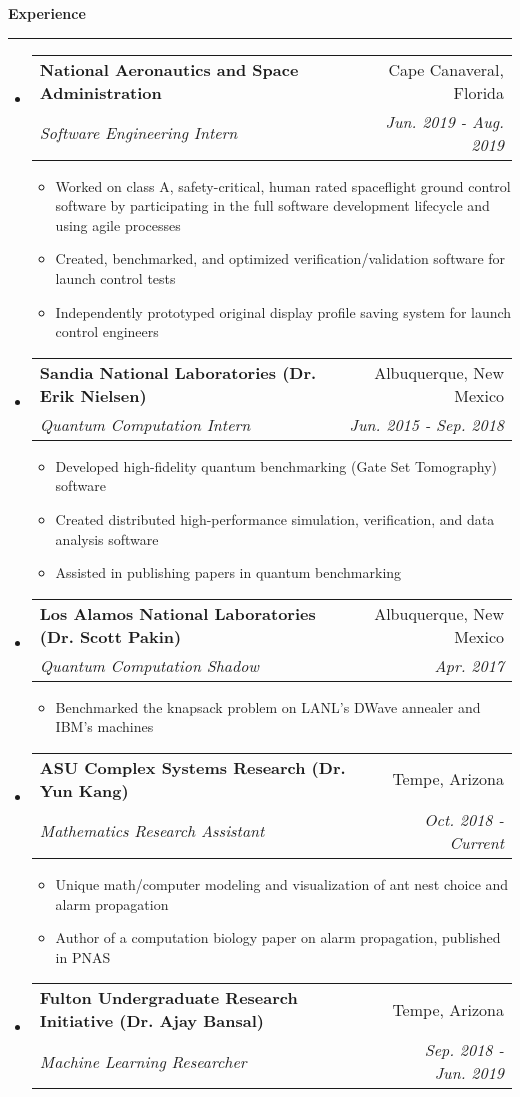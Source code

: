 \documentclass[letterpaper,11pt]{article}
\makeatletter
\newcommand{\sectionline}{
    \noindent\rule[0.5ex]{\linewidth}{0.5pt}
}
\newcommand{\resitem}[1]{\item[] #1 \vspace{-3pt}}
\newcommand{\resheading}[1]{
    {\large \textbf{#1}}
    \sectionline
}
\newcommand{\colfill}{@{\extracolsep{\fill}}}
\newcommand{\ressubheading}[4]{
\begin{tabular*}{6.5in}{l\colfill r}
		\textbf{#1} & #2 \\
		\textit{#3} & \textit{#4} \\
\end{tabular*}\vspace{-6pt}}
\makeatother
\begin{document}
\resheading{Experience}
\begin{itemize}
 \item[]
     \ressubheading{National Aeronautics and Space Administration}{Cape Canaveral, Florida}{Software Engineering Intern}{Jun. 2019 - Aug. 2019}
 	\begin{itemize}
 		\resitem{Worked on class A, safety-critical, human rated spaceflight ground control software by participating in the full software development lifecycle and using agile processes}
        \resitem{Created, benchmarked, and optimized verification/validation software for launch control tests}
 		\resitem{Independently prototyped original display profile saving system for launch control engineers}
 	\end{itemize}
 \item[]
    \ressubheading{Sandia National Laboratories (Dr. Erik Nielsen)}{Albuquerque, New Mexico}{Quantum Computation Intern}{Jun. 2015 - Sep. 2018}
 	\begin{itemize}
        \resitem{Developed high-fidelity quantum benchmarking (Gate Set Tomography) software}
 		\resitem{Created distributed high-performance simulation, verification, and data analysis software}
 		\resitem{Assisted in publishing papers in quantum benchmarking}
 	\end{itemize}
 \item[]
     \ressubheading{Los Alamos National Laboratories (Dr. Scott Pakin)}{Albuquerque, New Mexico}{Quantum Computation Shadow}{Apr. 2017}
 	\begin{itemize}
 		\resitem{Benchmarked the knapsack problem on LANL's DWave annealer and IBM's machines}
 	\end{itemize}
 \item[]
    \ressubheading{ASU Complex Systems Research (Dr. Yun Kang)}{Tempe, Arizona}{Mathematics Research Assistant}{Oct. 2018 - Current}
 	\begin{itemize}
 		\resitem{Unique math/computer modeling and visualization of ant nest choice and alarm propagation}
        \resitem{Author of a computation biology paper on alarm propagation, published in PNAS}
 	\end{itemize}
 \item[]
     \ressubheading{Fulton Undergraduate Research Initiative (Dr. Ajay Bansal)}{Tempe, Arizona}{Machine Learning Researcher}{Sep. 2018 - Jun. 2019}

\end{itemize}
\end{document}
